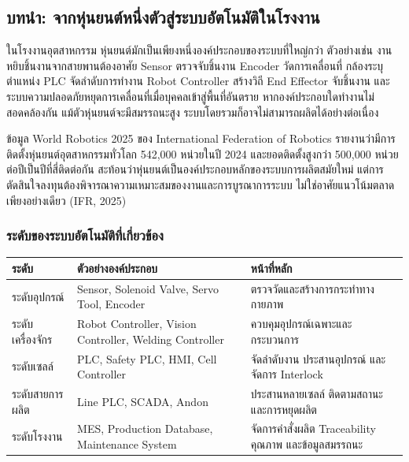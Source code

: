 \subsection{บทนำ: จากหุ่นยนต์หนึ่งตัวสู่ระบบอัตโนมัติในโรงงาน}

ในโรงงานอุตสาหกรรม หุ่นยนต์มักเป็นเพียงหนึ่งองค์ประกอบของระบบที่ใหญ่กว่า ตัวอย่างเช่น งานหยิบชิ้นงานจากสายพานต้องอาศัย Sensor ตรวจจับชิ้นงาน Encoder วัดการเคลื่อนที่ กล้องระบุตำแหน่ง PLC จัดลำดับการทำงาน Robot Controller สร้างวิถี End Effector จับชิ้นงาน และระบบความปลอดภัยหยุดการเคลื่อนที่เมื่อบุคคลเข้าสู่พื้นที่อันตราย หากองค์ประกอบใดทำงานไม่สอดคล้องกัน แม้ตัวหุ่นยนต์จะมีสมรรถนะสูง ระบบโดยรวมก็อาจไม่สามารถผลิตได้อย่างต่อเนื่อง

ข้อมูล World Robotics 2025 ของ International Federation of Robotics รายงานว่ามีการติดตั้งหุ่นยนต์อุตสาหกรรมทั่วโลก 542,000 หน่วยในปี 2024 และยอดติดตั้งสูงกว่า 500,000 หน่วยต่อปีเป็นปีที่สี่ติดต่อกัน สะท้อนว่าหุ่นยนต์เป็นองค์ประกอบหลักของระบบการผลิตสมัยใหม่ แต่การตัดสินใจลงทุนต้องพิจารณาความเหมาะสมของงานและการบูรณาการระบบ ไม่ใช่อาศัยแนวโน้มตลาดเพียงอย่างเดียว (IFR, 2025)

\subsubsection{ระดับของระบบอัตโนมัติที่เกี่ยวข้อง}

\begin{table}[htbp]
    \centering
    \small
    \begin{tabularx}{\textwidth}{L{0.18\textwidth} Y Y}
        \hline
        \textbf{ระดับ} & \textbf{ตัวอย่างองค์ประกอบ} & \textbf{หน้าที่หลัก} \\
        \hline
        ระดับอุปกรณ์ & Sensor, Solenoid Valve, Servo Tool, Encoder & ตรวจวัดและสร้างการกระทำทางกายภาพ \\
        ระดับเครื่องจักร & Robot Controller, Vision Controller, Welding Controller & ควบคุมอุปกรณ์เฉพาะและกระบวนการ \\
        ระดับเซลล์ & PLC, Safety PLC, HMI, Cell Controller & จัดลำดับงาน ประสานอุปกรณ์ และจัดการ Interlock \\
        ระดับสายการผลิต & Line PLC, SCADA, Andon & ประสานหลายเซลล์ ติดตามสถานะและการหยุดผลิต \\
        ระดับโรงงาน & MES, Production Database, Maintenance System & จัดการคำสั่งผลิต Traceability คุณภาพ และข้อมูลสมรรถนะ \\
        \hline
    \end{tabularx}
\end{table}


